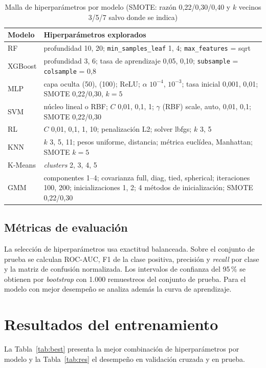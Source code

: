 \documentclass[conference]{IEEEtran}
\begin{document}
\begin{table}[!t]
\centering
\caption{Malla de hiperparámetros por modelo (SMOTE: razón 0,22/0,30/0,40 y $k$ vecinos 3/5/7 salvo donde se indica)}
\label{tab:grid}
\footnotesize
\begin{tabular}{@{}p{1.3cm}p{6.6cm}@{}}
\toprule
Modelo & Hiperparámetros explorados \\
\midrule
RF & profundidad {10, 20}; \texttt{min\_samples\_leaf} {1, 4}; \texttt{max\_features} = sqrt \\
XGBoost & profundidad {3, 6}; tasa de aprendizaje {0,05, 0,10}; \texttt{subsample} = \texttt{colsample} = 0,8 \\
MLP & capa oculta {(50), (100)}; ReLU; $\alpha$ {$10^{-4}$, $10^{-3}$}; tasa inicial {0,001, 0,01}; SMOTE 0,22/0,30, $k=5$ \\
SVM & núcleo lineal o RBF; $C$ {0,01, 0,1, 1}; $\gamma$ (RBF) {scale, auto, 0,01, 0,1}; SMOTE 0,22/0,30 \\
RL & $C$ {0,01, 0,1, 1, 10}; penalización L2; solver lbfgs; $k$ {3, 5} \\
KNN & $k$ {3, 5, 11}; pesos {uniforme, distancia}; métrica {euclídea, Manhattan}; SMOTE $k=5$ \\
K-Means & \emph{clusters} {2, 3, 4, 5} \\
GMM & componentes {1--4}; covarianza {full, diag, tied, spherical}; iteraciones {100, 200}; inicializaciones {1, 2}; 4 métodos de inicialización; SMOTE 0,22/0,30 \\
\bottomrule
\end{tabular}
\end{table}

\subsection{Métricas de evaluación}
La selección de hiperparámetros usa exactitud balanceada. Sobre el conjunto de prueba se calculan ROC-AUC, F1 de la clase positiva, precisión y \emph{recall} por clase y la matriz de confusión normalizada. Los intervalos de confianza del 95\,\% se obtienen por \emph{bootstrap} con 1.000 remuestreos del conjunto de prueba. Para el modelo con mejor desempeño se analiza además la curva de aprendizaje.

\section{Resultados del entrenamiento}
La Tabla~\ref{tab:best} presenta la mejor combinación de hiperparámetros por modelo y la Tabla~\ref{tab:res} el desempeño en validación cruzada y en prueba.
\end{document}
